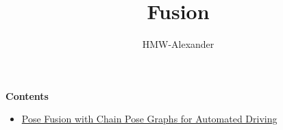 \documentclass[letterpaper,11pt]{article}
\title{\textbf{Fusion}}
\author{HMW-Alexander}
\begin{document}
\maketitle

\textbf{Contents}
\begin{itemize}
	\item \href{./Pose_Fusion_with_Chain_Pose_Graphs_for_Automated_Driving/document.html}{Pose Fusion with Chain Pose Graphs for Automated Driving}
\end{itemize}
	
\end{document}
